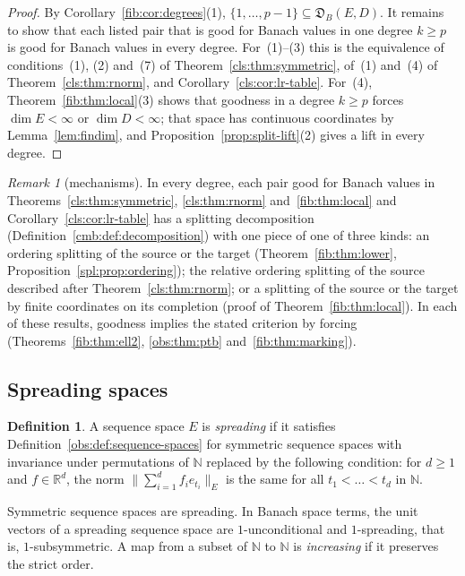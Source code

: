 \documentclass[11pt]{amsart}
\theoremstyle{definition}
\newtheorem{definition}[theorem]{Definition}
\theoremstyle{remark}
\newtheorem{remark}[theorem]{Remark}
\numberwithin{equation}{section}
\newcommand{\N}{\mathbb N}
\newcommand{\norm}[1]{\lVert #1\rVert}
\theoremstyle{plain}
\theoremstyle{definition}
\theoremstyle{plain}
\newcommand{\fD}{\mathfrak D}
\begin{document}
\begin{proof}
By Corollary~\ref{fib:cor:degrees}(1), $\{1,\dots,p-1\}\subseteq\fD_B(E,D)$. It remains to show that each listed pair
that is good for Banach values in one degree $k\ge p$ is good for Banach values in every degree. For~(1)--(3) this is the
equivalence of conditions~(1), (2) and~(7) of Theorem~\ref{cls:thm:symmetric}, of~(1) and~(4) of
Theorem~\ref{cls:thm:rnorm}, and Corollary~\ref{cls:cor:lr-table}. For~(4), Theorem~\ref{fib:thm:local}(3) shows that
goodness in a degree $k\ge p$ forces $\dim E<\infty$ or $\dim D<\infty$; that space has continuous coordinates by
Lemma~\ref{lem:findim}, and Proposition~\ref{prop:split-lift}(2) gives a lift in every degree.
\end{proof}

\begin{remark}[mechanisms]\label{cls:rem:mechanisms}
In every degree, each pair good for Banach values in Theorems~\ref{cls:thm:symmetric}, \ref{cls:thm:rnorm}
and~\ref{fib:thm:local} and Corollary~\ref{cls:cor:lr-table} has a splitting decomposition
(Definition~\ref{cmb:def:decomposition}) with one piece of one of three kinds: an ordering splitting of the source or the
target (Theorem~\ref{fib:thm:lower}, Proposition~\ref{spl:prop:ordering}); the relative ordering splitting of the source
described after Theorem~\ref{cls:thm:rnorm}; or a splitting of the source or the target by finite coordinates on its
completion (proof of Theorem~\ref{fib:thm:local}). In each of these results, goodness implies the stated criterion by
forcing (Theorems~\ref{fib:thm:ell2}, \ref{obs:thm:ptb} and~\ref{fib:thm:marking}).
\end{remark}

\subsection{Spreading spaces}\label{cls:ssec:spreading}

\begin{definition}\label{cls:def:spreading}
A sequence space $E$ is \emph{spreading} if it satisfies Definition~\ref{obs:def:sequence-spaces} for symmetric
sequence spaces with invariance under permutations of $\N$ replaced by the following condition: for $d\ge1$ and
$f\in\mathbb R^d$, the norm $\norm{\sum_{i=1}^df_ie_{t_i}}_E$ is the same for all $t_1<\dots<t_d$ in $\N$.
\end{definition}

Symmetric sequence spaces are spreading. In Banach space terms, the unit vectors of a spreading sequence space are
$1$\nobreakdash-unconditional and $1$\nobreakdash-spreading, that is, $1$\nobreakdash-subsymmetric. A map from a subset of
$\N$ to $\N$ is \emph{increasing} if it preserves the strict order.
\end{document}
